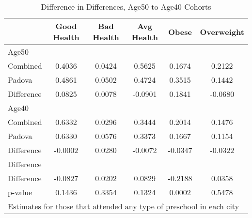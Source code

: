 \begin{table}[htbp]\centering
\caption{Difference in Differences, Age50 to Age40 Cohorts}
\begin{tabular}{l*{5}{c}}
\hline\hline
            & Good Health&  Bad Health&  Avg Health&       Obese&  Overweight\\
\hline
Age50       &            &            &            &            &            \\
Combined    &      0.4036&      0.0424&      0.5625&      0.1674&      0.2122\\
Padova      &      0.4861&      0.0502&      0.4724&      0.3515&      0.1442\\
Difference  &      0.0825&      0.0078&     -0.0901&      0.1841&     -0.0680\\
\hline
Age40       &            &            &            &            &            \\
Combined    &      0.6332&      0.0296&      0.3444&      0.2014&      0.1476\\
Padova      &      0.6330&      0.0576&      0.3373&      0.1667&      0.1154\\
Difference  &     -0.0002&      0.0280&     -0.0072&     -0.0347&     -0.0322\\
\hline
Difference  &            &            &            &            &            \\
Difference  &     -0.0827&      0.0202&      0.0829&     -0.2188&      0.0358\\
p-value     &      0.1436&      0.3354&      0.1324&      0.0002&      0.5478\\
\hline\hline
\multicolumn{6}{l}{\footnotesize Estimates for those that attended any type of preschool in each city}\\
\end{tabular}
\end{table}
